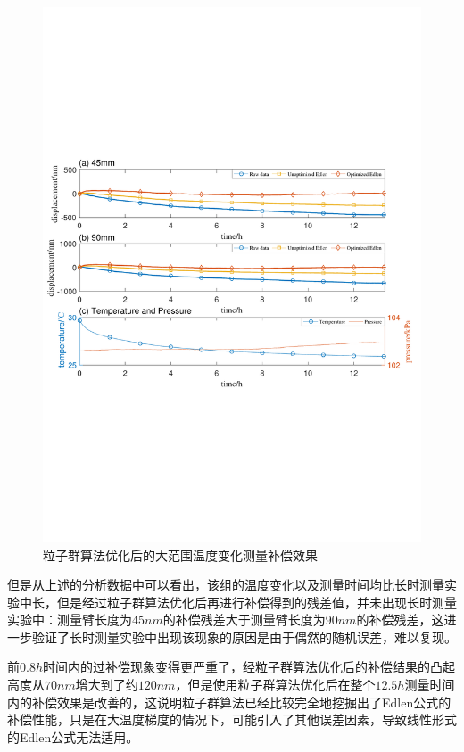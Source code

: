 \begin{figure}[htb]
  \centering
  \includegraphics[width=14cm]{fig/4-fig/edpso_大范围温度变化测量数据.pdf}
  \caption{粒子群算法优化后的大范围温度变化测量补偿效果}
  \label{fig:粒子群算法优化后的大范围温度变化测量补偿效果}
\end{figure}

但是从上述的分析数据中可以看出，该组的温度变化以及测量时间均比长时测量实验中长，但是经过粒子群算法优化后再进行补偿得到的残差值，并未出现长时测量实验中：测量臂长度为$45nm$的补偿残差大于测量臂长度为$90nm$的补偿残差，这进一步验证了长时测量实验中出现该现象的原因是由于偶然的随机误差，难以复现。

前$0.8h$时间内的过补偿现象变得更严重了，经粒子群算法优化后的补偿结果的凸起高度从$70nm$增大到了约$120nm$，但是使用粒子群算法优化后在整个$12.5h$测量时间内的补偿效果是改善的，这说明粒子群算法已经比较完全地挖掘出了Edlen公式的补偿性能，只是在大温度梯度的情况下，可能引入了其他误差因素，导致线性形式的Edlen公式无法适用。

